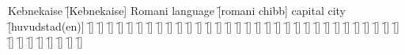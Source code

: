 \begin{questions}
\begin{multicols}{2}
        \question Kebnekaise \f[Kebnekaise]
        \question Romani language \f[romani chibb]
        \question capital city \f[huvudstad(en)]
        \question  \f[]
        \question  \f[]
        \question  \f[]
        \question  \f[]
        \question  \f[]
        \question  \f[]
        \question  \f[]
        \question  \f[]
        \question  \f[]
        \question  \f[]
        \question  \f[]
        \question  \f[]
        \question  \f[]
        \question  \f[]
        \question  \f[]
        \question  \f[]
        \question  \f[]
        \question  \f[]
        \question  \f[]
        \question  \f[]
        \question  \f[]
        \question  \f[]
        \question  \f[]
        \question  \f[]
        \question  \f[]
        \question  \f[]
        \question  \f[]
        \question  \f[]
        \question  \f[]
        \question  \f[]
        \question  \f[]
        \question  \f[]
        \question  \f[]
        \question  \f[]
        \question  \f[]
        \question  \f[]
        \question  \f[]
        \question  \f[]
        \question  \f[]
        \question  \f[]
    \end{multicols}
\end{questions}
